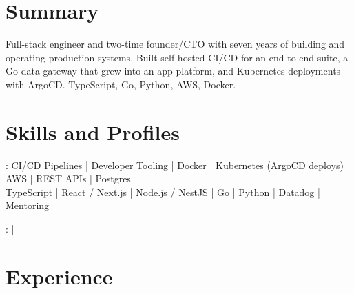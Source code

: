 \documentclass[print]{jack-resume}
\begin{document}
\pagecolor{darkmodeBackground}


\begin{minipage}[t][1cm][t]{.03\textwidth}
    \hfill
\end{minipage}

\section{Summary}
Full-stack engineer and two-time founder/CTO with seven years of building and operating production systems. Built self-hosted CI/CD for an end-to-end suite, a Go data gateway that grew into an app platform, and Kubernetes deployments with ArgoCD. TypeScript, Go, Python, AWS, Docker.
\sectionsep

\section{Skills and Profiles}
:
CI/CD Pipelines \hfill | \hfill
Developer Tooling \hfill | \hfill
Docker \hfill | \hfill
Kubernetes (ArgoCD deploys) \hfill | \hfill
AWS \hfill | \hfill
REST APIs \hfill | \hfill
Postgres \\
\hspace{1.0cm} TypeScript \hfill | \hfill
React / Next.js \hfill | \hfill
Node.js / NestJS \hfill | \hfill
Go \hfill | \hfill
Python \hfill | \hfill
Datadog \hfill | \hfill
Mentoring \\

\raggedright{
    :
      \href{https://www.linkedin.com/in/jack-sturtevant/}{ \ExternalLink} |
     \href{https://github.com/jacksturt}{ \ExternalLink}}

\section{Experience}
\end{document}

